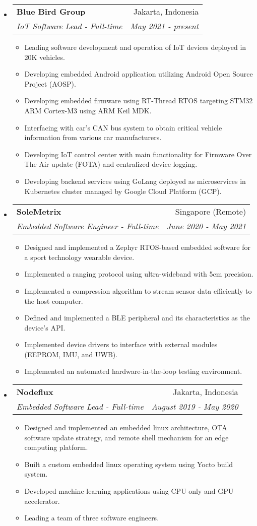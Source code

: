 \documentclass[letterpaper,9pt]{article}
\makeatletter
\newcommand{\resitem}[1]{\item #1 \vspace{-2pt}}
\newcommand{\ressubheading}[4]{
\begin{tabular*}{7.0in}{l@{\cftdotfill{\cftsecdotsep}\extracolsep{\fill}}r}
		\textbf{#1} & #2 \\
        \textit{#3} & \textit{#4} \\
\end{tabular*}\vspace{-6.3pt}}
\makeatother
\begin{document}
\begin{itemize}
  \item 
    \ressubheading{Blue Bird Group}{Jakarta, Indonesia}{IoT Software Lead - Full-time}{May 2021 - present}
    \begin{itemize}
      \item Leading software development and operation of IoT devices deployed in 20K vehicles. 
      \item Developing embedded Android application utilizing Android Open Source Project (AOSP).
      \item Developing embedded firmware using RT-Thread RTOS targeting STM32 ARM Cortex-M3 using ARM Keil MDK.
      \item Interfacing with car's CAN bus system to obtain critical vehicle information from various car manufacturers.
      \item Developing IoT control center with main functionality for Firmware Over The Air update (FOTA) and centralized device logging.
      \item Developing backend services using GoLang deployed as microservices in Kubernetes cluster managed by Google Cloud Platform (GCP).
    \end{itemize}
  
  \item
        \ressubheading{SoleMetrix}{Singapore (Remote)}{Embedded Software Engineer - Full-time}{June 2020 - May 2021}
        \begin{itemize}
          \resitem{Designed and implemented a Zephyr RTOS-based embedded software for a sport technology wearable device.}
          \resitem{Implemented a ranging protocol using ultra-wideband with 5cm precision.}
          \resitem{Implemented a compression algorithm to stream sensor data efficiently to the host computer.}
          \resitem{Defined and implemented a BLE peripheral and its characteristics as the device's API.}
          \resitem{Implemented device drivers to interface with external modules (EEPROM, IMU, and UWB).}
          \resitem{Implemented an automated hardware-in-the-loop testing environment.}
        \end{itemize}

  \item
        \ressubheading{Nodeflux}{Jakarta, Indonesia}{Embedded Software Lead - Full-time}{August 2019 - May 2020}
        \begin{itemize}
          \resitem{Designed and implemented an embedded linux architecture, OTA software update strategy, and remote shell mechanism for an edge computing platform.}
          \resitem{Built a custom embedded linux operating system using Yocto build system.}
          \resitem{Developed machine learning applications using CPU only and GPU accelerator.}
          \resitem{Leading a team of three software engineers.}
        \end{itemize}


\end{itemize}
\end{document}
